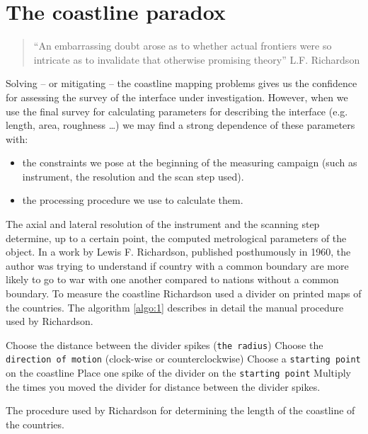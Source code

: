 \section{The coastline paradox}
\begin{quote}
    ``An  embarrassing doubt arose as to whether actual frontiers were so intricate as to invalidate that otherwise promising theory'' L.F. Richardson
\end{quote}
Solving -- or mitigating --  the coastline mapping problems gives us the confidence for assessing the survey of the interface under investigation. However, when we use the final survey for calculating parameters for describing the interface (e.g. length, area, roughness \ldots) we may find a strong dependence of these parameters with:
\begin{itemize}
    \item the constraints we pose at the beginning of the measuring campaign (such as instrument, the resolution and the scan step used).
    \item the processing procedure we use to calculate them.
\end{itemize} 
The axial and lateral resolution of the instrument and the scanning step determine, up to a certain point, the computed metrological parameters of the object. In a work by Lewis F. Richardson, published posthumously in 1960, the author was trying to understand if country with a common boundary are more likely to go to war with one another compared to nations without a common boundary. To measure the coastline Richardson used a divider on printed maps of the countries. The algorithm \ref{algo:1} describes in detail the manual procedure used by Richardson.

\begin{algorithm}[H]
\vspace{5pt}
{}
Choose the distance between the divider spikes (\texttt{the radius})\;
Choose the \texttt{direction of motion} (clock-wise or counterclockwise)\;
Choose a \texttt{starting point} on the coastline\;
Place one spike of the divider on the \texttt{starting point}\;
 Multiply the times you moved the divider for distance between the divider spikes.
 \caption{The procedure used by Richardson for determining the length of the coastline of the countries.}
 \vspace{5pt}
 \label{algo:1}
\end{algorithm}

